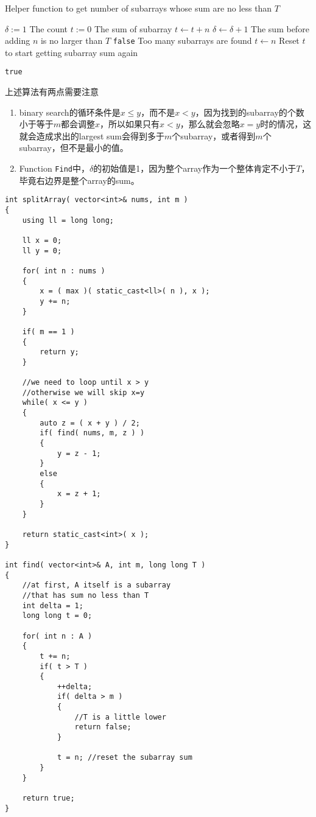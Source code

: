 \begin{algorithm}[H]
\caption{Helper function to get number of subarrays whose sum are no less than $T$}
\begin{algorithmic}[1]
\State $\delta:=1$ \Comment The count
\State $t:=0$ \Comment The sum of subarray
\State $t\gets t+n$
\State $\delta\gets\delta+1$ \Comment The sum before adding $n$ is no larger than $T$
\State \Return \texttt{false} \Comment Too many subarrays are found
\EndIf
\State $t\gets n$ \Comment Reset $t$ to start getting subarray sum again
\end{algorithmic}
\end{algorithm}
\begin{algorithm}[H]
\begin{algorithmic}[1]
\EndIf
\EndFor
\State \Return \texttt{true}
\EndProcedure
\end{algorithmic}
\end{algorithm}
上述算法有两点需要注意
\begin{enumerate}
\item binary search的循环条件是$x\leq y$，而不是$x<y$，因为找到的subarray的个数小于等于$m$都会调整$x$，所以如果只有$x<y$，那么就会忽略$x=y$时的情况，这就会造成求出的largest sum会得到多于$m$个subarray，或者得到$m$个subarray，但不是最小的值。
\item Function \texttt{Find}中，$\delta$的初始值是1，因为整个array作为一个整体肯定不小于$T$，毕竟右边界是整个array的sum。
\end{enumerate}

\setcounter{lstlisting}{0}
\begin{lstlisting}[style=customc, caption={Binary Search}]
int splitArray( vector<int>& nums, int m )
{
    using ll = long long;

    ll x = 0;
    ll y = 0;

    for( int n : nums )
    {
        x = ( max )( static_cast<ll>( n ), x );
        y += n;
    }

    if( m == 1 )
    {
        return y;
    }

    //we need to loop until x > y
    //otherwise we will skip x=y
    while( x <= y )
    {
        auto z = ( x + y ) / 2;
        if( find( nums, m, z ) )
        {
            y = z - 1;
        }
        else
        {
            x = z + 1;
        }
    }

    return static_cast<int>( x );
}

int find( vector<int>& A, int m, long long T )
{
    //at first, A itself is a subarray
    //that has sum no less than T
    int delta = 1;
    long long t = 0;

    for( int n : A )
    {
        t += n;
        if( t > T )
        {
            ++delta;
            if( delta > m )
            {
                //T is a little lower
                return false;
            }

            t = n; //reset the subarray sum
        }
    }

    return true;
}
\end{lstlisting}